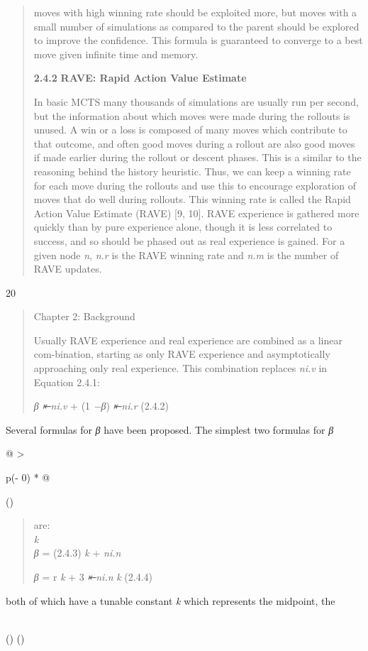\begin{quote}
moves with high winning rate should be exploited more, but moves with a
small number of simulations as compared to the parent should be explored
to improve the confidence. This formula is guaranteed to converge to a
best move given infinite time and memory.

\textbf{2.4.2} \textbf{RAVE: Rapid Action Value Estimate}

In basic MCTS many thousands of simulations are usually run per second,
but the information about which moves were made during the rollouts is
unused. A win or a loss is composed of many moves which contribute to
that outcome, and often good moves during a rollout are also good moves
if made earlier during the rollout or descent phases. This is a similar
to the reasoning behind the history heuristic. Thus, we can keep a
winning rate for each move during the rollouts and use this to encourage
exploration of moves that do well during rollouts. This winning rate is
called the Rapid Action Value Estimate (RAVE) {[}9, 10{]}. RAVE
experience is gathered more quickly than by pure experience alone,
though it is less correlated to success, and so should be phased out as
real experience is gained. For a given node \emph{n}, \emph{n.r} is the
RAVE winning rate and \emph{n.m} is the number of RAVE updates.
\end{quote}

20

\begin{quote}
Chapter 2: Background

Usually RAVE experience and real experience are combined as a linear
com-bination, starting as only RAVE experience and asymptotically
approaching only real experience. This combination replaces \emph{ni.v}
in Equation 2.4.1:

\emph{β ⇤ni.v} + (1 \emph{−β}) \emph{⇤ni.r} (2.4.2)
\end{quote}

Several formulas for \emph{β} have been proposed. The simplest two
formulas for \emph{β}

\begin{longtable}[]{@{}
  >{\raggedright\arraybackslash}p{(\columnwidth - 0\tabcolsep) * }@{}}
\toprule()
\begin{minipage}[b]{\linewidth}\raggedright
\begin{quote}
are:\\
\emph{k}\\
\emph{β} = (2.4.3) \emph{k} + \emph{ni.n}

\emph{β} = r \emph{k} + 3 \emph{⇤ni.n} \emph{k} (2.4.4)
\end{quote}

both of which have a tunable constant \emph{k} which represents the
midpoint, the\strut
\end{minipage} \\
\midrule()
\endhead
\bottomrule()
\end{longtable}

